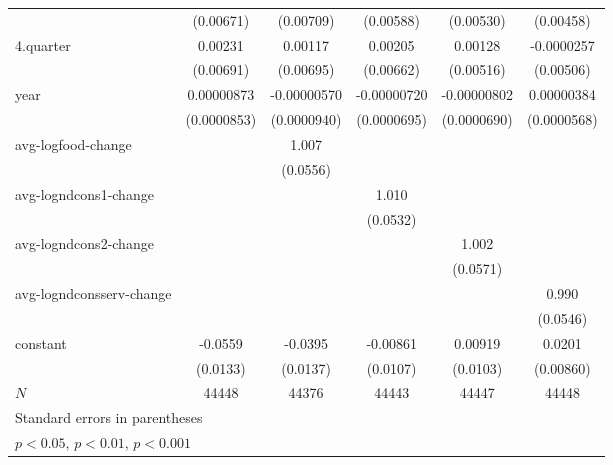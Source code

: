 \begin{table}[htbp]
\begin{tabular}{l*{5}{c}}
            &   (0.00671)         &   (0.00709)         &   (0.00588)         &   (0.00530)         &   (0.00458)         \\
4.quarter   &     0.00231         &     0.00117         &     0.00205         &     0.00128         &  -0.0000257         \\
            &   (0.00691)         &   (0.00695)         &   (0.00662)         &   (0.00516)         &   (0.00506)         \\
year        &  0.00000873         & -0.00000570         & -0.00000720         & -0.00000802         &  0.00000384         \\
            & (0.0000853)         & (0.0000940)         & (0.0000695)         & (0.0000690)         & (0.0000568)         \\
avg-logfood-change&                     &       1.007\sym{***}&                     &                     &                     \\
            &                     &    (0.0556)         &                     &                     &                     \\
avg-logndcons1-change&                     &                     &       1.010\sym{***}&                     &                     \\
            &                     &                     &    (0.0532)         &                     &                     \\
avg-logndcons2-change&                     &                     &                     &       1.002\sym{***}&                     \\
            &                     &                     &                     &    (0.0571)         &                     \\
avg-logndconsserv-change&                     &                     &                     &                     &       0.990\sym{***}\\
            &                     &                     &                     &                     &    (0.0546)         \\
constant    &     -0.0559\sym{***}&     -0.0395\sym{**} &    -0.00861         &     0.00919         &      0.0201\sym{*}  \\
            &    (0.0133)         &    (0.0137)         &    (0.0107)         &    (0.0103)         &   (0.00860)         \\
\hline
\(N\)       &       44448         &       44376         &       44443         &       44447         &       44448         \\
\hline\hline
\multicolumn{6}{l}{\footnotesize Standard errors in parentheses}\\
\multicolumn{6}{l}{\footnotesize \sym{*} \(p<0.05\), \sym{**} \(p<0.01\), \sym{***} \(p<0.001\)}\\
\end{tabular}
\end{table}
